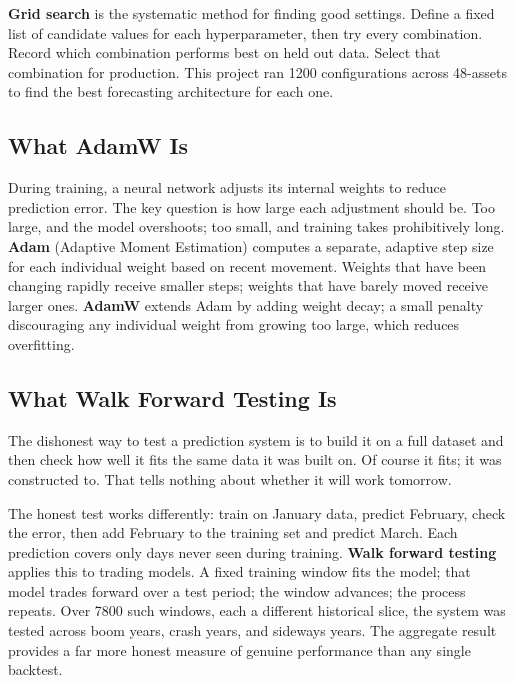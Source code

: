 \documentclass[journal]{IEEEtran}
\begin{document}
\textbf{Grid search} is the systematic method for finding good settings.
Define a fixed list of candidate values for each hyperparameter, then
try every combination. Record which combination performs best on held out
data. Select that combination for production. This project ran 1200
configurations across 48-assets to find the best forecasting architecture
for each one.

\subsection{What AdamW Is}

During training, a neural network adjusts its internal weights to reduce
prediction error. The key question is how large each adjustment should be.
Too large, and the model overshoots; too small, and training takes
prohibitively long. \textbf{Adam} (Adaptive Moment Estimation) computes
a separate, adaptive step size for each individual weight based on recent
movement. Weights that have been changing rapidly receive smaller steps;
weights that have barely moved receive larger ones. \textbf{AdamW} extends
Adam by adding weight decay; a small penalty discouraging any individual
weight from growing too large, which reduces overfitting.

\subsection{What Walk Forward Testing Is}

The dishonest way to test a prediction system is to build it on a full
dataset and then check how well it fits the same data it was built on.
Of course it fits; it was constructed to. That tells nothing about
whether it will work tomorrow.

The honest test works differently: train on January data, predict
February, check the error, then add February to the training set and
predict March. Each prediction covers only days never seen during training.
\textbf{Walk forward testing} applies this to trading models. A fixed
training window fits the model; that model trades forward over a test
period; the window advances; the process repeats. Over 7800 such windows,
each a different historical slice, the system was tested across boom
years, crash years, and sideways years. The aggregate result provides
a far more honest measure of genuine performance than any single backtest.

\end{document}
